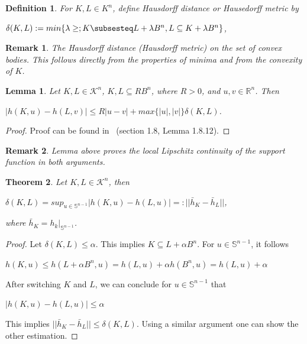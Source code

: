 \documentclass[a4paper]{book}
\newtheorem{theorem}{Theorem}%
\newtheorem{lemma}[theorem]{Lemma}%
\newtheorem{remark}{Remark}%
\newtheorem{definition}{Definition}%
\begin{document}
\begin{definition}
    For $K,L\in K^{n}$, define Hausdorff distance or Hausedorff metric by
    \begin{center}
        $\delta(K,L):=min\{\lambda\geq;K\subsesteq L+\lambda B^{n},L\subseteq K+\lambda B^{n}\}$,
    \end{center}
\end{definition}

\begin{remark}
    The Hausdorff distance (Hausdorff metric) on the set of convex bodies. This follows directly from the properties of minima and from the convexity of $K$.
\end{remark}

\begin{lemma}
    Let $K,L\in\mathscr{K}^{n}$, $K,L\subseteq RB^{n}$, where $R>0$, and $u,v\in\mathbb{R}^{n}$. Then
    \begin{center}
        $|h(K,u)-h(L,v)|\leq R|u-v|+max\{|u|,|v|\}\delta(K,L)$.
    \end{center}
\end{lemma}
\begin{proof}
    Proof can be found in~\cite{schneider2014convex} (section 1.8, Lemma 1.8.12).
\end{proof}

\begin{remark}
    Lemma above proves the local Lipschitz continuity of the support function in both arguments.
\end{remark}

\begin{theorem}
    Let $K,L\in\mathscr{K}^{n}$, then
    \begin{center}
        $\delta(K,L)=sup_{u\in\mathbb{S}^{n-1}}|h(K,u)-h(L,u)|=:||\bar{h}_{K}-\bar{h}_{L}||$,
    \end{center}
    where $\bar{h}_{K}=h_{k}|_{\mathbb{S}^{n-1}}$.
\end{theorem}
\begin{proof}
    Let $\delta(K,L)\leq\alpha$. This implies $K\subseteq L+\alpha B^{n}$. For $u\in\mathbb{S}^{n-1}$, it follows 
    \begin{center}
        $h(K,u)\leq h(L+\alpha B^{n},u)=h(L,u)+\alpha h(B^{n},u)=h(L,u)+\alpha$
    \end{center}
    After switching $K$ and $L$, we can conclude for $u\in\mathbb{S}^{n-1}$ that
    \begin{center}
        $|h(K,u)-h(L,u)|\leq\alpha$
    \end{center}
    This implies $||\bar{h}_{K}-\bar{h}_{L}||\leq\delta(K,L)$. Using a similar argument one can show the other estimation.
\end{proof}
\end{document}
